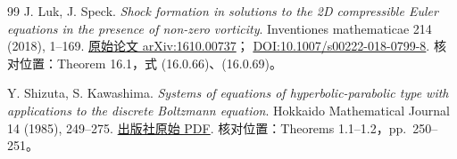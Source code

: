 \begin{thebibliography}{99}
J. Luk, J. Speck.
\emph{Shock formation in solutions to the 2D compressible Euler equations in the presence of non-zero vorticity}.
Inventiones mathematicae 214 (2018), 1--169.
\href{https://arxiv.org/pdf/1610.00737}{原始论文 arXiv:1610.00737}；
\href{https://doi.org/10.1007/s00222-018-0799-8}{DOI:10.1007/s00222-018-0799-8}.
核对位置：Theorem 16.1，式 (16.0.66)、(16.0.69)。

Y. Shizuta, S. Kawashima.
\emph{Systems of equations of hyperbolic-parabolic type with applications to the discrete Boltzmann equation}.
Hokkaido Mathematical Journal 14 (1985), 249--275.
\href{https://www.math.sci.hokudai.ac.jp/hmj/page/14-2/pdf/HMJ_14_2_1985_249-275.pdf}{出版社原始 PDF}.
核对位置：Theorems 1.1--1.2，pp.~250--251。
\end{thebibliography}
